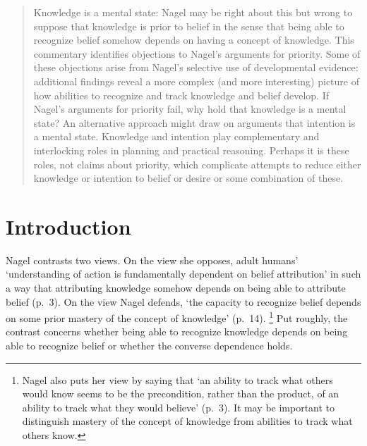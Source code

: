 \documentclass[12pt,\papersize]{extarticle}
\begin{document}
\setlength\footnotesep{1em}




\maketitle



\begin{abstract}
\noindent
Knowledge is a mental state: Nagel may be right about this  but wrong to suppose that knowledge is prior to belief in the sense that being able to recognize belief somehow depends on having a concept of knowledge.  This commentary identifies objections  to Nagel's arguments for priority.  Some of these objections arise from Nagel's selective use of developmental evidence: additional findings reveal a more complex (and more interesting) picture of how abilities to recognize and track knowledge and belief develop.  If Nagel's arguments for priority fail, why hold that knowledge is a mental state?  An alternative approach might draw on arguments that intention is a mental state.  Knowledge and intention play complementary and interlocking roles in planning and practical reasoning.  Perhaps it is these roles, not claims about priority, which complicate attempts to reduce either knowledge or intention to belief or desire or some combination of these.
\end{abstract}




\section{Introduction}
Nagel contrasts two views.
On the view she opposes, 
adult humans' `understanding of action is fundamentally dependent on belief attribution' 
in such a way that
attributing knowledge  somehow depends on 
being able to attribute belief (p.\ 3).
On the view Nagel defends, `the capacity to recognize belief depends on some prior mastery of the concept of knowledge' (p.\ 14).%
\footnote{
Nagel also puts her view by saying that `an ability to track what others would know seems to be the precondition, rather than the product, of an ability to track what they would believe' (p.\ 3).
It may be important to distinguish mastery of the concept of knowledge from abilities to track what others know.
}
Put roughly, the contrast concerns whether being able to recognize knowledge depends on being able to recognize belief or whether the converse dependence holds.
\end{document}
